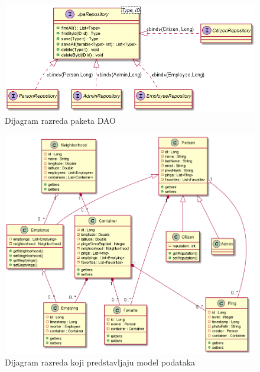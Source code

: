			\begin{figure}[H]
				\includegraphics[scale=0.5]{figures/DAOClassDiagram.PNG}
				\centering
				\caption{Dijagram razreda paketa DAO}
				\label{fig:dao-cd}
			\end{figure}
		
			\begin{figure}[H]
				\includegraphics[scale=0.5]{figures/ModelClassDiagram.PNG}
				\centering
				\caption{Dijagram razreda koji predstavljaju model podataka}
				\label{fig:model-cd}
			\end{figure}
		
